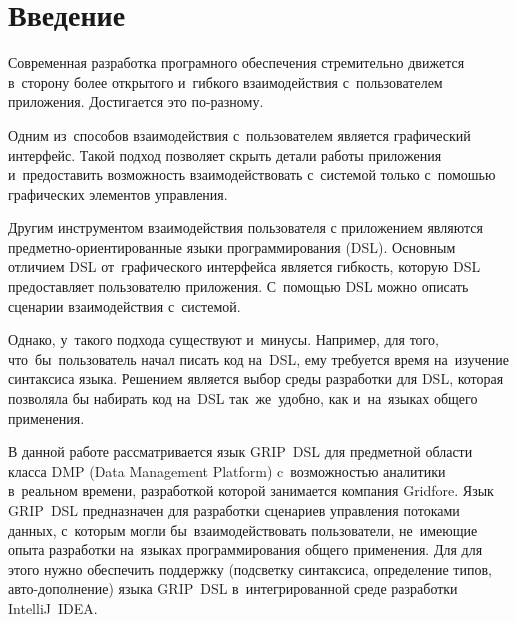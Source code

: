 \chapter*{Введение}                         %



Современная разработка програмного обеспечения стремительно движется в~сторону более открытого и~гибкого взаимодействия с~пользователем приложения.
Достигается это по-разному. 

Одним из~способов взаимодействия с~пользователем является графический интерфейс. Такой подход позволяет скрыть детали работы приложения и~предоставить возможность взаимодействовать с~системой только с~помошью графических элементов управления.

Другим инструментом взаимодействия пользователя с приложением являются предметно-ориентированные языки программирования (DSL). Основным отличием DSL от~графического интерфейса является гибкость, которую DSL предоставляет пользователю приложения. С~помощью DSL можно описать сценарии взаимодействия с~системой. 

Однако, у~такого подхода существуют и~минусы. Например, для того, что~бы~пользователь начал писать код на~DSL, ему требуется время на~изучение синтаксиса языка. Решением является выбор среды разработки для DSL, которая позволяла бы набирать код на~DSL так~же~удобно, как и~на~языках общего применения. 

В данной работе рассматривается язык GRIP~DSL для предметной области класса DMP (Data Management Platform) c~возможностью аналитики в~реальном времени, разработкой которой занимается компания Gridfore. Язык GRIP~DSL предназначен для разработки сценариев управления потоками данных, с~которым могли бы~взаимодействовать пользователи, не~имеющие опыта разработки на~языках программирования общего применения. Для для этого нужно обеспечить поддержку (подсветку синтаксиса, определение типов, авто-дополнение) языка GRIP~DSL в~интегрированной среде разработки IntelliJ~IDEA.  

%
